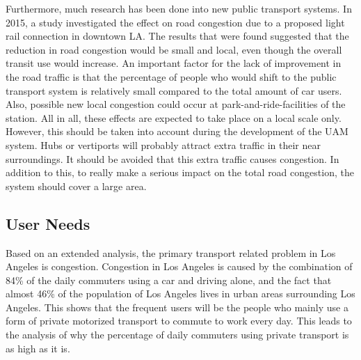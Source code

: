 Furthermore, much research has been done into new public transport systems. In 2015, a study \cite{lightrail} investigated the effect on road congestion due to a proposed light rail connection in downtown LA. The results that were found suggested that the reduction in road congestion would be small and local, even though the overall transit use would increase. An important factor for the lack of improvement in the road traffic is that the percentage of people who would shift to the public transport system is relatively small compared to the total amount of car users. Also, possible new local congestion could occur at park-and-ride-facilities of the station. All in all, these effects are expected to take place on a local scale only. However, this should be taken into account during the development of the UAM system. Hubs or vertiports will probably attract extra traffic in their near surroundings. It should be avoided that this extra traffic causes congestion. In addition to this, to really make a serious impact on the total road congestion, the system should cover a large area. 

\subsection{User Needs}
\label{needs}
Based on an extended analysis, the primary transport related problem in Los Angeles is congestion. Congestion in Los Angeles is caused by the combination of 84\% of the daily commuters using a car and driving alone, and the fact that almost 46\% of the population of Los Angeles lives in urban areas surrounding Los Angeles. This shows that the frequent users will be the people who mainly use a form of private motorized transport to commute to work every day. This leads to the analysis of why the percentage of daily commuters using private transport is as high as it is. 

